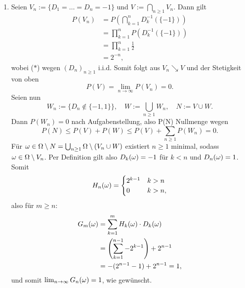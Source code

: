 \documentclass[12pt]{scrartcl}
\begin{document}
\begin{enumerate}[$i)$,wide]
\item Seien $V_n:=\{D_1=\dots=D_n=-1\}$ und $V:=\bigcap_{n\ge 1}V_n$.
Dann gilt
\begin{align*}
P(V_n) &= P(\bigcap_{k=1}^n D_k^{-1}(\{-1\})) \\
&= \prod_{k=1}^n P(D_k^{-1} (\{-1\})) \tag{$\ast$} \\
&= \prod_{k=1}^n \frac{1}{2} \\
&= 2^{-n},
\end{align*}
wobei ($\ast$) wegen $(D_n)_{n\ge 1}$ i.i.d.
Somit folgt aus $V_n\searrow V$ und der Stetigkeit von oben
$$P(V)=\lim_{n\rightarrow \infty} P(V_n)=0.$$
Seien nun
$$W_n:=\{D_n\notin\{-1,1\}\},\quad W:=\bigcup_{n\ge 1}W_n,\quad N:=V\cup W.$$
Dann $P(W_n)=0$ nach Aufgabenstellung, also P(N) Nullmenge wegen
$$P(N)\le P(V)+P(W)\le P(V)+\sum_{n\ge 1}P(W_n)=0.$$
Für $\omega\in\Omega\setminus N=\bigcup_{n\ge 1}\Omega\setminus (V_n\cup W)$ existiert $n\ge 1$ minimal, sodass $\omega\in\Omega\setminus V_n$. Per Definition gilt also $D_k(\omega)=-1$ für $k<n$ und $D_n(\omega)=1$. Somit
$$H_n(\omega)=
\begin{cases}
2^{k-1} & k>n \\
0 & k>n,
\end{cases}$$
also für $m\ge n$:
\begin{align*}
G_m(\omega) &= \sum_{k=1}^m{H_k(\omega)\cdot D_k(\omega)} \\
&= \left(\sum_{k=1}^{n-1} -2^{k-1}\right)+2^{n-1} \\
&= -(2^{n-1}-1)+2^{n-1} = 1,
\end{align*}
und somit $\lim_{n\rightarrow\infty} G_n(\omega)=1$, wie gewünscht.
\end{enumerate}
\ausruecken
\end{document}

